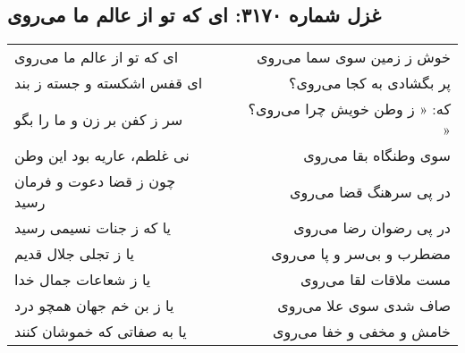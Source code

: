 \begin{center}
\section*{غزل شماره ۳۱۷۰: ای که تو از عالم ما می‌روی}
\label{sec:3170}
\begin{longtable}{l p{0.5cm} r}
ای که تو از عالم ما می‌روی
&&
خوش ز زمین سوی سما می‌روی
\\
ای قفس اشکسته و جسته ز بند
&&
پر بگشادی به کجا می‌روی؟
\\
سر ز کفن بر زن و ما را بگو
&&
که: « ز وطن خویش چرا می‌روی؟ »
\\
نی غلطم، عاریه بود این وطن
&&
سوی وطنگاه بقا می‌روی
\\
چون ز قضا دعوت و فرمان رسید
&&
در پی سرهنگ قضا می‌روی
\\
یا که ز جنات نسیمی رسید
&&
در پی رضوان رضا می‌روی
\\
یا ز تجلی جلال قدیم
&&
مضطرب و بی‌سر و پا می‌روی
\\
یا ز شعاعات جمال خدا
&&
مست ملاقات لقا می‌روی
\\
یا ز بن خم جهان همچو درد
&&
صاف شدی سوی علا می‌روی
\\
یا به صفاتی که خموشان کنند
&&
خامش و مخفی و خفا می‌روی
\\
\end{longtable}
\end{center}
